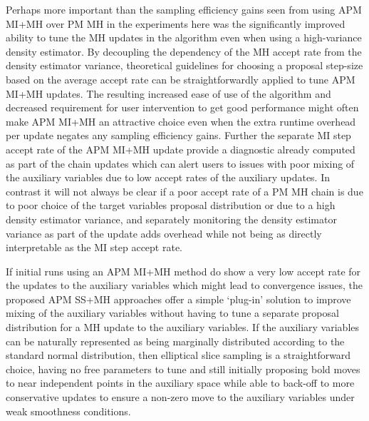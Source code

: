 Perhaps more important than the sampling efficiency gains seen from using \ac{APM} \ac{MI}+\ac{MH} over \ac{PM} \ac{MH} in the experiments here was the significantly improved ability to tune the \ac{MH} updates in the algorithm even when using a high-variance density estimator. By decoupling the dependency of the \ac{MH} accept rate from the density estimator variance, theoretical guidelines for choosing a proposal step-size based on the average accept rate can be straightforwardly applied to tune \ac{APM} \ac{MI}+\ac{MH} updates. The resulting increased ease of use of the algorithm and decreased requirement for user intervention to get good performance might often make \ac{APM} \ac{MI}+\ac{MH} an attractive choice even when the extra runtime overhead per update negates any sampling efficiency gains. Further the separate \ac{MI} step accept rate of the \ac{APM} \ac{MI}+\ac{MH} update provide a diagnostic already computed as part of the chain updates which can alert users to issues with poor mixing of the auxiliary variables due to low accept rates of the auxiliary updates. In contrast it will not always be clear if a poor accept rate of a \ac{PM} \ac{MH} chain is due to poor choice of the target variables proposal distribution or due to a high density estimator variance, and separately monitoring the density estimator variance as part of the update adds overhead while not being as directly interpretable as the \ac{MI} step accept rate.

If initial runs using an \ac{APM} \ac{MI}+\ac{MH} method do show a very low accept rate for the updates to the auxiliary variables which might lead to convergence issues, the proposed \ac{APM} \ac{SS}+\ac{MH} approaches offer a simple `plug-in' solution to improve mixing of the auxiliary variables without having to tune a separate proposal distribution for a \ac{MH} update to the auxiliary variables. If the auxiliary variables can be naturally represented as being marginally distributed according to the standard normal distribution, then elliptical slice sampling is a straightforward choice, having no free parameters to tune and still initially proposing bold moves to near independent points in the auxiliary space while able to back-off to more conservative updates to ensure a non-zero move to the auxiliary variables under weak smoothness conditions. 

